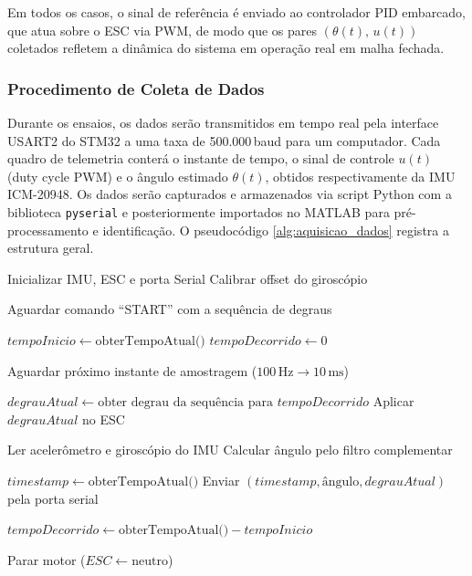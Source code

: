 Em todos os casos, o sinal de referência é enviado ao controlador PID embarcado, que atua sobre o ESC via PWM, de modo que os pares $(\theta(t),\, u(t))$ coletados refletem a dinâmica do sistema em operação real em malha fechada.

\subsubsection{Procedimento de Coleta de Dados}

Durante os ensaios, os dados serão transmitidos em tempo real pela interface USART2 do STM32 a uma taxa de 500.000\,baud para um computador. Cada quadro de telemetria conterá o instante de tempo, o sinal de controle $u(t)$ (duty cycle PWM) e o ângulo estimado $\theta(t)$, obtidos respectivamente da IMU ICM-20948. Os dados serão capturados e armazenados via script Python com a biblioteca \texttt{pyserial} e posteriormente importados no MATLAB para pré-processamento e identificação. O pseudocódigo \ref{alg:aquisicao_dados} registra a estrutura geral.

\begin{algorithm}[H]
\caption{Ciclo de Controle e Aquisição de Dados do IMU}
\begin{algorithmic}[1]
\label{alg:aquisicao_dados}
    \State Inicializar IMU, ESC e porta Serial
    \State Calibrar offset do giroscópio
\EndProcedure

\Statex
{}
    \State Aguardar comando ``START'' com a sequência de degraus
    
    \State $tempoInicio \gets \text{obterTempoAtual()}$
    \State $tempoDecorrido \gets 0$
    
        \State Aguardar próximo instante de amostragem ($100\,\text{Hz} \to 10\,\text{ms}$)
        
        \State $degrauAtual \gets \text{obter degrau da sequência para } tempoDecorrido$
        \State Aplicar $degrauAtual$ no ESC
        
        \State Ler acelerômetro e giroscópio do IMU
        \State Calcular ângulo pelo filtro complementar
        
        \State $timestamp \gets \text{obterTempoAtual()}$
        \State Enviar $(timestamp, \text{ângulo}, degrauAtual)$ pela porta serial
        
        \State $tempoDecorrido \gets \text{obterTempoAtual()} - tempoInicio$
    \EndWhile
    
    \State Parar motor ($ESC \gets \text{neutro}$)
\EndProcedure
\end{algorithmic}
\end{algorithm}


